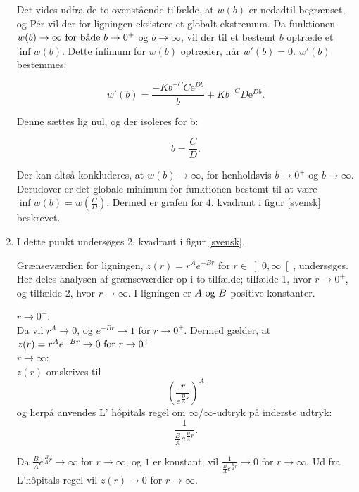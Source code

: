 \begin{enumerate}
   Det vides udfra de to ovenstående tilfælde, at $w(b)$ er nedadtil begrænset, og Pér \citep[korollar 7.16, s. 121]{Analyse bog} vil der for ligningen eksistere et globalt ekstremum. Da funktionen $w(b) \to \infty \ \textnormal{for både} \ b\to 0^+$ og $b \to \infty$, vil der til et bestemt $b$ optræde et $\inf{w(b)}$. Dette infimum for $w(b)$ optræder, når $w'(b) = 0$. $w'(b)$ bestemmes:

$$w'(b)=\frac{-Kb^{-C}C\mathrm{e}^{Db}}{b}+Kb^{-C}D\mathrm{e}^{Db}.$$

Denne sættes lig nul, og der isoleres for b: 

\begin{equation}
    b=\frac{C}{D}.
\end{equation}

Der kan altså konkluderes, at $w(b) \to \infty$, for henholdsvis $b \to 0^+$ og $b \to \infty$. Derudover er det globale minimum for funktionen bestemt til at være $\inf{w(b)}= w \left(\frac{C}{D} \right)$. Dermed er grafen for 4. kvadrant i figur \ref{svensk} beskrevet. \\
    
    \item  I dette punkt undersøges 2. kvadrant i figur \ref{svensk}.
    
    Grænseværdien for ligningen, $z(r) = r^A e^{-Br}$ for $r \in \left]0,\infty \right[$, undersøges.
 Her deles analysen af grænseværdier op i to tilfælde; tilfælde 1, hvor $r \to 0^+$, og tilfælde 2, hvor $r \to \infty$. I ligningen er $A \ \textnormal{og} \ B$ positive konstanter.\\
 \hfill \break

    $r \to 0^+$:\\
    Da vil $r^A \to 0$, og $e^{-Br} \to 1$ for $r \to 0^+ $. Dermed gælder, at $z(r)=r^A e^{-Br} \to 0 \ \textnormal{for} \ r \to 0^+$ \\

    $r \to \infty$: \\
   $z(r)$ omskrives til
   \begin{equation*}
       \left(\frac{r}{e^{\frac{B}{A}r}} \right)^A
   \end{equation*}
   og herpå anvendes L' hôpitals regel om $\infty/\infty$-udtryk \citep[sætning 7.23 s. 125]{Analyse bog} på inderste udtryk:
    $$\frac{1}{\frac{B}{A}e^{\frac{B}{A}r}}.$$
    
    Da $\frac{B}{A}e^{\frac{B}{A}r} \to \infty$ for $r \to \infty$, og $1$ er konstant, vil $\frac{1}{\frac{B}{A}e^{\frac{B}{A}r}} \to 0$ for $r \to \infty.$
    Ud fra L'hôpitals regel \citep[sætning 7.23 s. 125]{Analyse bog} vil $z(r) \to 0$ for $r \to \infty$. 


\end{enumerate}
